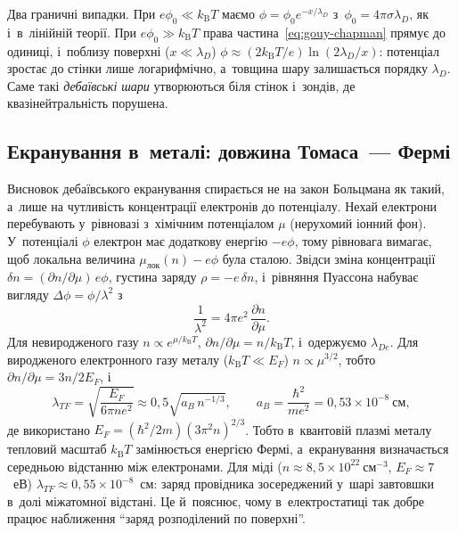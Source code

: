 Два граничні випадки. При $e\phi_0\ll k_{\mathrm B}T$ маємо
$\phi=\phi_0e^{-x/\lambda_D}$ з~$\phi_0=4\pi\sigma\lambda_D$, як і~в~лінійній
теорії. При $e\phi_0\gg k_{\mathrm B}T$ права частина~\eqref{eq:gouy-chapman} прямує до
одиниці, і~поблизу поверхні ($x\ll\lambda_D$) $\phi\approx(2k_{\mathrm
			B}T/e)\ln(2\lambda_D/x)$: потенціал зростає до стінки лише логарифмічно, а~товщина шару
залишається порядку $\lambda_D$. Саме такі \emph{дебаївські шари} утворюються біля стінок
і~зондів, де квазінейтральність порушена.



\subsection*{Екранування в~металі: довжина Томаса~--- Фермі}\label{sec:thomas-fermi}



Висновок дебаївського екранування спирається не на закон Больцмана як такий, а~лише на
чутливість концентрації електронів до потенціалу. Нехай електрони перебувають у~рівновазі
з~хімічним потенціалом $\mu$ (нерухомий іонний фон). У~потенціалі $\phi$ електрон має
додаткову енергію $-e\phi$, тому рівновага вимагає, щоб локальна величина
$\mu_{\mathrm{лок}}(n)-e\phi$ була сталою. Звідси зміна концентрації $\delta
	n=(\partial n/\partial\mu)\,e\phi$, густина заряду $\rho=-e\,\delta n$, і~рівняння
Пуассона набуває вигляду $\Delta\phi=\phi/\lambda^2$ з~
\begin{equation}\label{eq:screening-general}
	\frac1{\lambda^2}=4\pi e^2\,\frac{\partial n}{\partial\mu}.
\end{equation}
Для невиродженого газу $n\propto e^{\mu/k_{\mathrm B}T}$, $\partial
	n/\partial\mu=n/k_{\mathrm B}T$, і~одержуємо $\lambda_{De}$. Для виродженого електронного
газу металу ($k_{\mathrm B}T\ll E_F$) $n\propto\mu^{3/2}$, тобто $\partial
	n/\partial\mu=3n/2E_F$, і
\begin{equation}\label{eq:thomas-fermi}
	\lambda_{TF}=\sqrt{\frac{E_F}{6\pi ne^2}}\approx0{,}5\sqrt{a_B\,n^{-1/3}},\qquad a_B=\frac{\hbar^2}{me^2}=0{,}53\times10^{-8}~\text{см},
\end{equation}
де використано $E_F=(\hbar^2/2m)(3\pi^2n)^{2/3}$. Тобто в~квантовій плазмі металу тепловий
масштаб $k_{\mathrm B}T$ замінюється енергією Фермі, а~екранування визначається середньою
відстанню між електронами. Для міді ($n\approx8{,}5\times10^{22}~\mathrm{см}^{-3}$,
$E_F\approx7$~еВ) $\lambda_{TF}\approx0{,}55\times10^{-8}$~см: заряд провідника
зосереджений у~шарі завтовшки в~долі міжатомної відстані. Це й~пояснює, чому
в~електростатиці так добре працює наближення \enquote{заряд розподілений по поверхні}.


